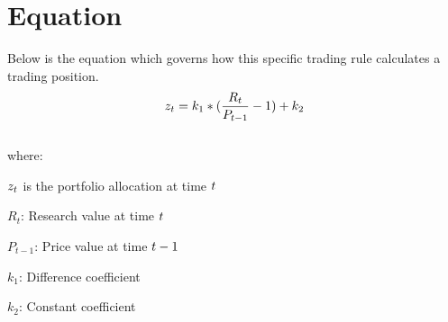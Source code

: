 \documentclass{article}
\begin{document}
\normalsize
\logo
{}
\tblofcontents
{}
\stoptable
\section{Equation}
Below is the equation which governs how this specific trading rule calculates a trading position.
\begin{equation}
z_t = k_1*(\frac{R_t}{P_{t-1}}-1)+k_2
\end{equation}
\\
where:

$z_t$ is the portfolio allocation at time $t$

$R_t$: Research value at time $t$

$P_{t-1}$: Price value at time $t -1$  

$k_1$: Difference coefficient

$k_2$: Constant coefficient

\keyterms
\furtherlinks
\end{document}
